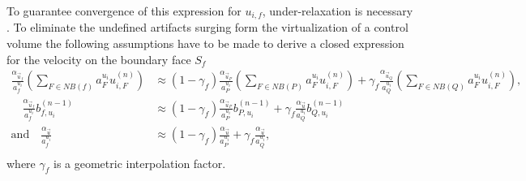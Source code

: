 To guarantee convergence of this expression for \(u_{i,f}\), under-relaxation is necessary \cite{majumdar88}. To eliminate the undefined artifacts surging form the virtualization of a control volume the following assumptions have to be made to derive a closed expression for the velocity on the boundary face \(S_f\)
\begin{subequations}
\label{eq:approxpwim}
\begin{align}
  \frac{\alpha_{\vec{u}_f}}{a_f^{u_i}} \left(\sum_{F \in NB(f)} a_F^{u_i} u_{i,F}^{(n)} \right)
  &\approx
  \left(1-\gamma_f\right) \frac{\alpha_{\vec{u}_P}}{a_P^{u_i}} \left(\sum_{F \in NB(P)} a_F^{u_i} u_{i,F}^{(n)} \right)
  +
  \gamma_f \frac{\alpha_{\vec{u}_Q}}{a_Q^{u_i}} \left(\sum_{F \in NB(Q)} a_F^{u_i} u_{i,F}^{(n)} \right), \\[1em]
  \quad
  \frac{\alpha_{\vec{u}_f}}{a_f^{u_i}}b_{f,u_i}^{(n-1)} 
  &\approx
  \left(1-\gamma_f\right) \frac{\alpha_{\vec{u}_P}}{a_P^{u_i}} b_{P,u_i}^{(n-1)} 
  +
  \gamma_f \frac{\alpha_{\vec{u}}}{a_Q^{u_i}} b_{Q,u_i}^{(n-1)} \\[1em]
  \text{and}
  \quad
  \frac{\alpha_{\vec{u}}}{a_f^{u_i}} 
  &\approx
  \left(1-\gamma_f\right) \frac{\alpha_{\vec{u}}}{a_P^{u_i}} 
  +
  \gamma_f \frac{\alpha_{\vec{u}}}{a_Q^{u_i}}, \\[1em]
\end{align}
\end{subequations}
where \(\gamma_f\) is a geometric interpolation factor. 

